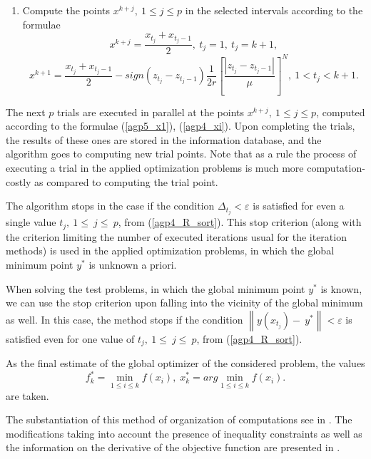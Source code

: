 \documentclass{cmi}
\begin{document}
\begin{enumerate}
	\item Compute the points $x^{k+j},\ 1\leq j\leq p$ in the selected intervals according to the formulae
	\begin{equation}
		\label{agp5_x1}
		x^{k+j}=\frac{x_{t_j}+x_{t_j-1}}{2},\ t_j=1,\ t_j=k+1,
	\end{equation}	
	\begin{equation}
		\label{agp4_xi}	
		x^{k+1}=\frac{x_{t_j}+x_{t_j-1}}{2}-sign\left(z_{t_j}-z_{t_j-1}\right)\frac{1}{2r}\left[\frac{\left|z_{t_j}-z_{t_j-1}\right|}{\mu}\right]^N,\ 1<t_j<k+1.
	\end{equation}
	
\end{enumerate}

The next $p$ trials are executed in parallel at the points $x^{k+j},\ 1\leq j\leq p$, computed according  to the formulae (\ref{agp5_x1}), (\ref{agp4_xi}). Upon completing the trials, the results of these ones  are stored in the information database, and the algorithm goes to computing new trial points.
Note that as a rule the process of executing a trial in the applied optimization problems is much more  computation-costly as compared to computing the trial point.

The algorithm stops in the case if the condition \(\Delta_{t_j} < \varepsilon\) is satisfied for even a  single value $t_j,\ 1\le\ j\le\ p$, from (\ref{agp4_R_sort}). This stop criterion (along with the criterion limiting the number of executed iterations usual for the  iteration methods) is used in the applied optimization problems, in which the global minimum point $y^*$ is unknown a priori. 

When solving the test problems, in which the global minimum point $y^*$ is known, we can use the stop criterion upon falling into the vicinity of the global minimum as well. In this case, the method  stops if the condition $\left\|y(x_{t_j})-\ y^\ast\right\| < \varepsilon$ is satisfied even for one value of $t_j,\  1\le\ j\le\ p$, from (\ref{agp4_R_sort}). 

As the final estimate of the global optimizer of the considered problem, the values 
\begin{equation} 
	f_k^*=\min_{1\leq i \leq k}f(x_i), \; x_k^*=arg \min_{1\leq i \leq k}f(x_i). 
\end{equation} 
are taken. 

The substantiation of this method of organization of computations see in . The  modifications taking into account the presence of inequality constraints as well as the information on the derivative of the objective function are presented in .
\end{document}

